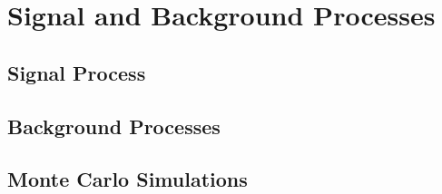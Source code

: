 \chapter{Signal and Background Processes}\label{cha:signal_and_background_processes}

\section{Signal Process}\label{sec:processes:signal}

\section{Background Processes}\label{sec:processes:background}

\section{Monte Carlo Simulations}\label{sec:processes:mc}
